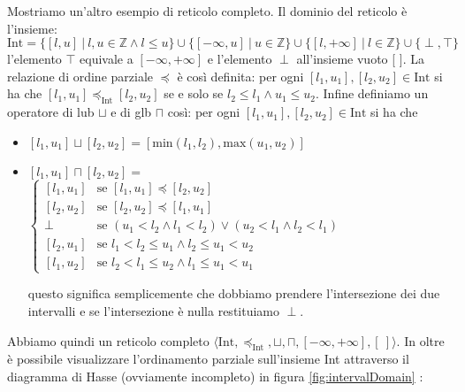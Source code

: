 \begin{example}
Mostriamo un'altro esempio di reticolo completo. Il dominio del reticolo è l'insieme:
\[\textrm{Int}=\{[l, u]\ |\ l, u\in\mathbb{Z} \wedge l\leq u\} \cup \{[-\infty, u]\ |\ u\in\mathbb{Z}\} \cup \{[l, +\infty]\ |\ l\in\mathbb{Z}\} \cup \{\perp, \top\}\]
l'elemento \(\top\) equivale a \([-\infty, +\infty]\) e l'elemento \(\perp\) all'insieme vuoto [ ].
La relazione di ordine parziale \(\preceq\) è così definita: per ogni \([l_1, u_1], [l_2, u_2]\in\textrm{Int}\) si ha che \([l_1, u_1]\preceq_{\textrm{Int}} [l_2, u_2]\) se e solo se \(l_2\leq l_1 \wedge u_1\leq u_2\). Infine definiamo un operatore di lub \(\sqcup\) e di glb \(\sqcap\) così: per ogni \([l_1, u_1], [l_2, u_2]\in\textrm{Int}\) si ha che 
\begin{itemize}
\item \([l_1, u_1]\sqcup [l_2, u_2] = [\textrm{min}(l_1, l_2), \textrm{max}(u_1, u_2)]\)
\item \([l_1, u_1]\sqcap [l_2, u_2] = \) 
	$
	\begin{cases}
	[l_1, u_1] & \textrm{se } [l_1, u_1]\preceq [l_2, u_2] \\
	[l_2, u_2] & \textrm{se } [l_2, u_2]\preceq [l_1, u_1] \\
	\perp      & \textrm{se } (u_1 < l_2 \wedge l_1 < l_2) \vee (u_2 < l_1 \wedge l_2 < l_1) \\
	[l_2, u_1] & \textrm{se } l_1<l_2\leq u_1 \wedge l_2\leq u_1<u_2 \\
	[l_1, u_2] & \textrm{se } l_2<l_1\leq u_2 \wedge l_1\leq u_1<u_1
	\end{cases} 
	$
 
    questo significa semplicemente che dobbiamo prendere l'intersezione dei due intervalli e se l'intersezione è nulla restituiamo \(\perp\).
\end{itemize}
Abbiamo quindi un reticolo completo \(\langle\textrm{Int}, \preceq_{\textrm{Int}}, \sqcup, \sqcap, [-\infty, +\infty], [\ ] \rangle\). In oltre è possibile visualizzare l'ordinamento parziale sull'insieme Int attraverso il diagramma di Hasse (ovviamente incompleto) in figura \ref{fig:intervalDomain} :

\begin{figure}
\begin{center}
\begin{scriptsize}
\end{scriptsize}
\end{center}
\end{figure}
\end{example}
